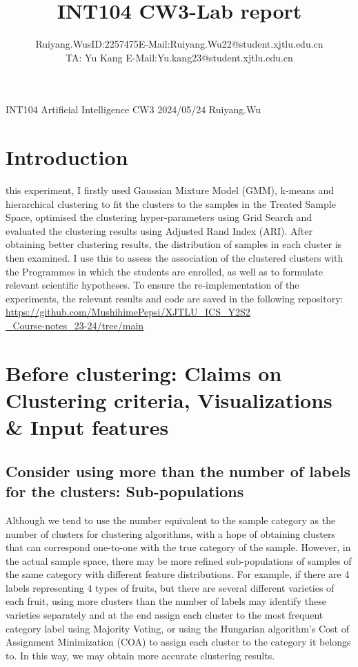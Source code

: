 \documentclass[journal]{IEEEtai}
\begin{document}
\title{INT104 CW3-Lab report} 


\author{Ruiyang.Wu\quad	sID:2257475\quad E-Mail:Ruiyang.Wu22@student.xjtlu.edu.cn
	\\
	TA: Yu Kang \quad E-Mail:Yu.kang23@student.xjtlu.edu.cn
}

{INT104 Artificial Intelligence CW3 2024/05/24 Ruiyang.Wu}

\maketitle


\section{\textbf{Introduction}}

 this experiment, I firstly used Gaussian Mixture Model (GMM), k-means and hierarchical clustering to fit the clusters to the samples in the Treated Sample Space, optimised the clustering hyper-parameters using Grid Search and evaluated the clustering results using Adjusted Rand Index (ARI). After obtaining better clustering results, the distribution of samples in each cluster is then examined. I use this to assess the association of the clustered clusters with the Programmes in which the students are enrolled, as well as to formulate relevant scientific hypotheses. To ensure the re-implementation of the experiments, the relevant results and code are saved in the following repository:
\href{https://github.com/MushihimePepsi/XJTLU_ICS_Y2S2_Course-notes_23-24/tree/main/INT104-%E4%BA%BA%E5%B7%A5%E6%99%BA%E8%83%BD}{\ul{https://github.com/MushihimePepsi/XJTLU\_ICS\_Y2S2\\\_Course-notes\_23-24/tree/main}}


\section{\textbf{Before clustering: Claims on Clustering criteria, Visualizations \& Input features}}
\subsection{\textbf{Consider using more than the number of labels for the clusters: Sub-populations}}
Although we tend to use the number equivalent to the sample category as the number of clusters for clustering algorithms, with a hope of obtaining clusters that can correspond one-to-one with the true category of the sample. However, in the actual sample space, there may be more refined sub-populations of samples of the same category with different feature distributions. For example, if there are 4 labels representing 4 types of fruits, but there are several different varieties of each fruit, using more clusters than the number of labels may identify these varieties separately and at the end assign each cluster to the most frequent category label using Majority Voting, or using the Hungarian algorithm's Cost of Assignment Minimization (COA) to assign each cluster to the category it belongs to. In this way, we may obtain more accurate clustering results. 
\end{document}
